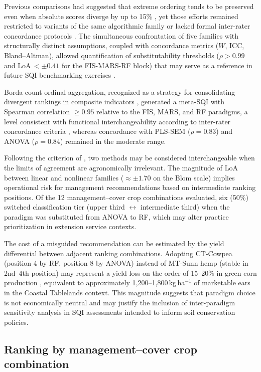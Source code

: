 \documentclass[pdflatex,sn-basic]{sn-jnl}%
\begin{document}
Previous comparisons had suggested that extreme ordering tends to be preserved even when absolute scores diverge by up to 15\% \citep{Mukherjee2014}, yet those efforts remained restricted to variants of the same algorithmic family or lacked formal inter-rater concordance protocols \citep{Zeraatpisheh2020,Pacci2026}. The simultaneous confrontation of five families with structurally distinct assumptions, coupled with concordance metrics ($W$, ICC, Bland--Altman), allowed quantification of substitutability thresholds ($\rho > 0.99$ and LoA\,$< \pm 0.41$ for the FIS-MARS-RF block) that may serve as a reference in future SQI benchmarking exercises \citep{Cherubin2016}.

Borda count ordinal aggregation, recognized as a strategy for consolidating divergent rankings in composite indicators \citep{Munda2012}, generated a meta-SQI with Spearman correlation $\geq 0.95$ relative to the FIS, MARS, and RF paradigms, a level consistent with functional interchangeability according to inter-rater concordance criteria \citep{Gwet2014}, whereas concordance with PLS-SEM ($\rho = 0.83$) and ANOVA ($\rho = 0.84$) remained in the moderate range.

Following the criterion of \cite{BlandAltman1999}, two methods may be considered interchangeable when the limits of agreement are agronomically irrelevant. The magnitude of LoA between linear and nonlinear families ($\approx \pm 1.70$ on the Blom scale) implies operational risk for management recommendations based on intermediate ranking positions. Of the 12 management--cover crop combinations evaluated, six (50\%) switched classification tier (upper third $\leftrightarrow$ intermediate third) when the paradigm was substituted from ANOVA to RF, which may alter practice prioritization in extension service contexts.

The cost of a misguided recommendation can be estimated by the yield differential between adjacent ranking combinations. Adopting CT-Cowpea (position 4 by RF, position 8 by ANOVA) instead of MT-Sunn hemp (stable in 2nd--4th position) may represent a yield loss on the order of 15--20\% in green corn production \citep{SantosJA2024}, equivalent to approximately 1,200--1,800\,kg\,ha$^{-1}$ of marketable ears in the Coastal Tablelands context. This magnitude suggests that paradigm choice is not economically neutral and may justify the inclusion of inter-paradigm sensitivity analysis in SQI assessments intended to inform soil conservation policies.

\subsection{Ranking by management--cover crop combination}\label{subsec:ranking}
\end{document}
